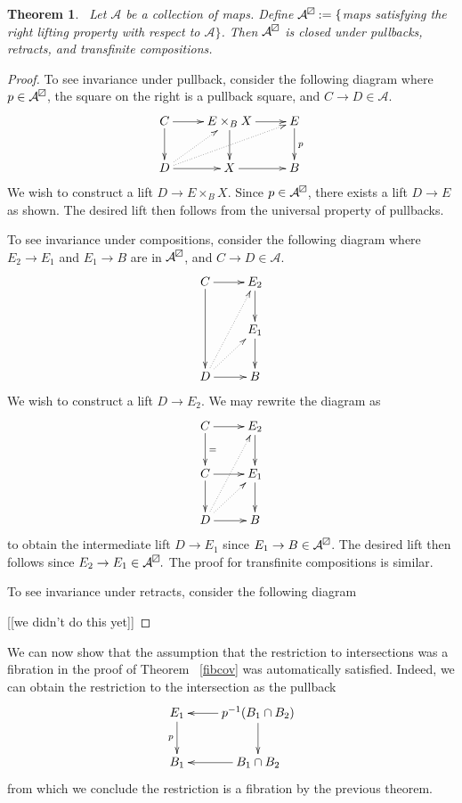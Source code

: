 \documentclass{article}
\newtheorem{theorem}{Theorem}[section]
\newtheorem{proposed work}[theorem]{Proposed Work}
\newcommand{\boxslash}{{\mathrel{
	\mathchoice{\tikz{ \draw (0,0) rectangle (6.5pt,6.5pt) -- (0,0);}} %
		{\tikz{ \draw (0,0) rectangle (6.5pt,6.5pt) -- (0,0);}} %
		{\tikz{ \draw (0,0) rectangle (5pt,5pt) -- (0,0);}} %
		{\tikz{ \draw (0,0) rectangle (5pt,5pt) -- (0,0);}} %
}}}
\newcommand{\xymat}[1]{\begin{align*}\xymatrix{ #1}\end{align*}}
\begin{document}
\begin{theorem}~\label{RLPclosed}
Let $\mathcal{A}$ be a collection of maps. Define $\mathcal{A}^\boxslash:=\lbrace$maps satisfying the right lifting property with respect to $\mathcal{A}\rbrace$. Then $\mathcal{A}^\boxslash$ is closed under pullbacks, retracts, and transfinite compositions. 
\end{theorem}

\begin{proof}
To see invariance under pullback, consider the following diagram where $p \in \mathcal{A}^\boxslash$, the square on the right is a pullback square, and $C \to D \in \mathcal{A}$.
\xymat{
C \ar[r] \ar[d] & E\times_B X \ar[d] \ar[r] &E\ar[d]^p\\ 
D \ar[r]\ar@{.>}[ur]\ar@{.>}[urr] & X\ar[r] & B} 
We wish to construct a lift $D \to E \times_B X$. Since $p \in \mathcal{A}^\boxslash$, there exists a lift $D \to E$ as shown. The desired lift then follows from the universal property of pullbacks.

To see invariance under compositions, consider the following diagram where $E_2 \to E_1$ and $E_1 \to B$ are in $\mathcal{A}^\boxslash$, and $C \to D \in \mathcal{A}$. 
\xymat{
C \ar[r]\ar[dd] & E_2 \ar[d]\\
 & E_{1}\ar[d]\\
D \ar[r] \ar@{.>}[ur]\ar@{.>}[uur] & B\\
}
We wish to construct a lift $D \to E_2$. We may rewrite the diagram as 
\xymat{
C \ar[r]\ar[d]^= & E_2 \ar[d]\\
C \ar[r]\ar[d] & E_{1}\ar[d]\\
D \ar[r] \ar@{.>}[ur]\ar@{.>}[uur] & B\\
}
to obtain the intermediate lift $D \to E_1$ since $E_1 \to B \in \mathcal{A}^\boxslash$. The desired lift then follows since $E_2 \to E_1 \in \mathcal{A}^\boxslash.$ The proof for transfinite compositions is similar.

To see invariance under retracts, consider the following diagram

[[we didn't do this yet]]

\end{proof}

We can now show that the assumption that the restriction to intersections was a fibration in the proof of Theorem ~\ref{fibcov} was automatically satisfied. Indeed, we can obtain the restriction to the intersection as the pullback 
\xymat{
E_1\ar[d]_p  & p^{-1}(B_1\cap B_2)\ar[d]\ar[l]\\
B_1 & B_1\cap B_2\ar[l]
}
from which we conclude the restriction is a fibration by the previous theorem.
\end{document}
